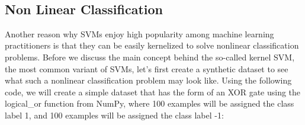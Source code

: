 \documentclass[11pt]{article}
\makeatletter
\newcommand{\boxspacing}{\kern\kvtcb@left@rule\kern\kvtcb@boxsep}
\newcommand{\prompt}[4]{
        {\ttfamily\llap{{\color{#2}[#3]:\hspace{3pt}#4}}\vspace{-\baselineskip}}
    }
\makeatother
\begin{document}
    \begin{center}
    \end{center}
    { \hspace*{\fill} \\}
    
    \begin{tcolorbox}[breakable, size=fbox, boxrule=1pt, pad at break*=1mm,colback=cellbackground, colframe=cellborder]
\prompt{In}{incolor}{ }{\boxspacing}
\begin{Verbatim}[commandchars=\\\{\}]

\end{Verbatim}
\end{tcolorbox}

    \hypertarget{non-linear-classification}{%
\subsection{Non Linear Classification}\label{non-linear-classification}}

    Another reason why SVMs enjoy high popularity among machine learning
practitioners is that they can be easily kernelized to solve nonlinear
classification problems. Before we discuss the main concept behind the
so-called kernel SVM, the most common variant of SVMs, let's first
create a synthetic dataset to see what such a nonlinear classification
problem may look like. Using the following code, we will create a simple
dataset that has the form of an XOR gate using the logical\_or function
from NumPy, where 100 examples will be assigned the class label 1, and
100 examples will be assigned the class label -1:
\end{document}
